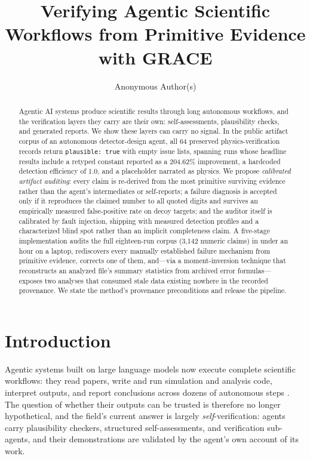 \documentclass{article}
\title{Verifying Agentic Scientific Workflows from Primitive Evidence with GRACE}
\author{Anonymous Author(s)}
\begin{document}
\maketitle
\begin{abstract}
Agentic AI systems produce scientific results through long autonomous workflows, and the verification layers they carry are their own: self-assessments, plausibility checks, and generated reports. We show these layers can carry no signal. In the public artifact corpus of an autonomous detector-design agent, all 64 preserved physics-verification records return \texttt{plausible: true} with empty issue lists, spanning runs whose headline results include a retyped constant reported as a 204.62\% improvement, a hardcoded detection efficiency of 1.0, and a placeholder narrated as physics. We propose \emph{calibrated artifact auditing}: every claim is re-derived from the most primitive surviving evidence rather than the agent's intermediates or self-reports; a failure diagnosis is accepted only if it reproduces the claimed number to all quoted digits and survives an empirically measured false-positive rate on decoy targets; and the auditor itself is calibrated by fault injection, shipping with measured detection profiles and a characterized blind spot rather than an implicit completeness claim. A five-stage implementation audits the full eighteen-run corpus (3{,}142 numeric claims) in under an hour on a laptop, rediscovers every manually established failure mechanism from primitive evidence, corrects one of them, and---via a moment-inversion technique that reconstructs an analyzed file's summary statistics from archived error formulas---exposes two analyses that consumed stale data existing nowhere in the recorded provenance. We state the method's provenance preconditions and release the pipeline.
\end{abstract}

\section{Introduction}

Agentic systems built on large language models now execute complete scientific workflows: they read papers, write and run simulation and analysis code, interpret outputs, and report conclusions across dozens of autonomous steps \citep{grace, hellert2026, diefenbacher2025, moreno2026, chung2026}. The question of whether their outputs can be trusted is therefore no longer hypothetical, and the field's current answer is largely \emph{self}-verification: agents carry plausibility checkers, structured self-assessments, and verification sub-agents, and their demonstrations are validated by the agent's own account of its work.
\end{document}
